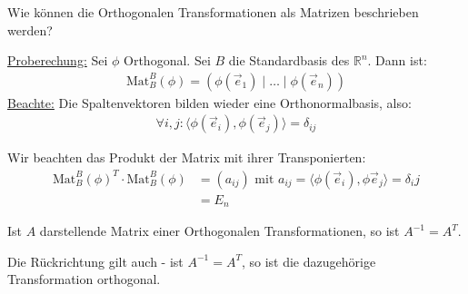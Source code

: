 \documentclass{report}
\newcommand*{\newpar}{\par\vspace{\baselineskip}\noindent}
\newcommand{\ul}[1]{\underline{#1}}
\newcommand{\bR}{\mathbb{R}}
\newcommand{\ve}{\vec{e}}
\newcommand{\Mat}[3]{\text{Mat}^{#1}_{#2}\left(#3\right)}
\newcommand{\scalar}[2]{\langle #1, #2 \rangle}
\begin{document}
\begin{question}
Wie können die Orthogonalen Transformationen als Matrizen beschrieben werden?
\end{question}
\ul{Proberechung:} Sei $\phi$ Orthogonal. Sei $B$ die Standardbasis des $\bR^n$. Dann ist:
\begin{align*}
 \Mat{B}{B}{\phi} = \left(\phi(\ve_1) \mid \hdots \mid \phi(\ve_n)\right)
\end{align*}
\ul{Beachte:} Die Spaltenvektoren bilden wieder eine Orthonormalbasis, also:
\begin{align*}
 \forall i,j : \scalar{\phi(\ve_i)}{\phi(\ve_j)} = \delta_{ij}
\end{align*}
\newpar
Wir beachten das Produkt der Matrix mit ihrer Transponierten:
\begin{align*}
\Mat{B}{B}{\phi}^T \cdot \Mat{B}{B}{\phi} &= (a_{ij}) \text{ mit } a_{ij} = \scalar{\phi(\ve_i)}{\phi{\ve_j}} = \delta_ij\\
&= E_n
\end{align*}
\begin{theorem}
 Ist $A$ darstellende Matrix einer Orthogonalen Transformationen, so ist $A^{-1} = A^T$.
\end{theorem}
\begin{proposition}
 Die Rückrichtung gilt auch - ist $A^{-1} = A^T$, so ist die dazugehörige Transformation orthogonal.
\end{proposition}
%
%
%
%
%
%
%
%
%
%
%
%
%
%
%
%
%
%
\end{document}
